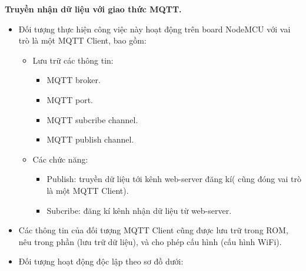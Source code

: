 \documentclass[a4paper,12pt,oneside]{article}
\begin{document}
\begin{itemize}
\begin{itemize}
	\end{itemize}

\end{itemize}


  


\noindent \textbf{Truyền nhận dữ liệu với giao thức MQTT.}
	\begin{itemize}
	\item Đối tượng thực hiện công việc này hoạt động trên board NodeMCU với vai trò là một MQTT Client, bao gồm:
		\begin{itemize}
		\item Lưu trữ các thông tin:
			\begin{itemize}
			\item	MQTT broker.
			\item	MQTT port.
			\item	MQTT subcribe channel.
			\item	MQTT publish channel.
			\end{itemize}
		\item	Các chức năng:
			\begin{itemize}
				\item Publish: truyền dữ liệu tới kênh web-server đăng kí( cũng đóng vai trò là một MQTT Client).
				\item	Subcribe: đăng kí kênh nhận dữ liệu từ web-server.
			\end{itemize}

		\end{itemize}
		\item Các thông tin của đối tượng MQTT Client cũng được lưu trữ trong ROM, nêu trong phần (lưu trữ dữ liệu), và cho phép cấu hình (cấu hình WiFi).
		\item Đối tượng hoạt động độc lập theo sơ đồ dưới:
		

\end{itemize}
\end{document}
